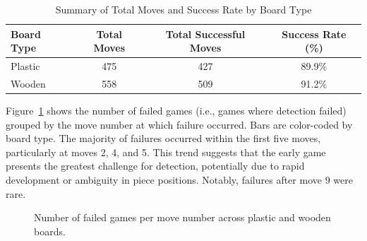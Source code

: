 \begin{table}[htbp]
\centering
\caption{Summary of Total Moves and Success Rate by Board Type}
\label{tab:board-type-accuracy}
\begin{tabular}{lccc}
\toprule
\textbf{Board Type} & \textbf{Total Moves} & \textbf{Total Successful Moves} & \textbf{Success Rate (\%)} \\
\midrule
Plastic & 475 & 427 & 89.9\% \\
Wooden  & 558 & 509 & 91.2\% \\
\bottomrule
\end{tabular}
\end{table}



Figure~\ref{fig:move-failures} shows the number of failed games (i.e., games where detection failed) grouped by the move number at which failure occurred. Bars are color-coded by board type. The majority of failures occurred within the first five moves, particularly at moves 2, 4, and 5. This trend suggests that the early game presents the greatest challenge for detection, potentially due to rapid development or ambiguity in piece positions. Notably, failures after move 9 were rare. \\


\begin{figure}[htbp]
\centering
{}
\caption{Number of failed games per move number across plastic and wooden boards.}
\label{fig:move-failures}
\end{figure}



